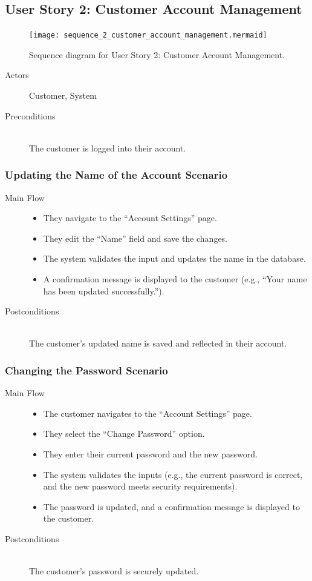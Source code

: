 \documentclass[twoside,a4paper,journal]{IEEEtran}
\begin{document}
\subsection{User Story 2: Customer Account Management}
\begin{figure}[!t]
\centering
\texttt{[image: sequence\_2\_customer\_account\_management.mermaid]}
\caption{Sequence diagram for User Story 2: Customer Account Management.}
\label{fig:sequence_2}
\end{figure}
\begin{description}
  \item[Actors] Customer, System
  \item[Preconditions] \hfill \\
    The customer is logged into their account.
\end{description}
\subsubsection{Updating the Name of the Account Scenario}
\begin{description}
  \item[Main Flow] \hfill
  \begin{itemize}
    \item They navigate to the ``Account Settings'' page.
    \item They edit the ``Name'' field and save the changes.
    \item The system validates the input and updates the name in the database.
    \item A confirmation message is displayed to the customer
      (e.g., ``Your name has been updated successfully.'').
  \end{itemize}
  \item[Postconditions] \hfill \\
    The customer's updated name is saved and reflected in their account.
\end{description}
\subsubsection{Changing the Password Scenario}
\begin{description}
  \item[Main Flow] \hfill
  \begin{itemize}
    \item The customer navigates to the ``Account Settings'' page.
    \item They select the ``Change Password'' option.
    \item They enter their current password and the new password.
    \item The system validates the inputs (e.g., the current password is
      correct, and the new password meets security requirements).
    \item The password is updated, and a confirmation message is displayed to
      the customer.
  \end{itemize}
  \item[Postconditions] \hfill \\
    The customer's password is securely updated.
\end{description}
\end{document}
